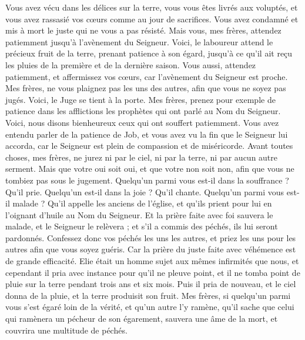 \begin{multicols}{2}
Vous avez vécu dans les délices sur la terre, vous vous êtes livrés aux voluptés, et vous avez rassasié vos cœurs comme au jour de sacrifices.
Vous avez condamné et mis à mort le juste qui ne vous a pas résisté.
Mais vous, mes frères, attendez patiemment jusqu'à l’avènement du Seigneur. Voici, le laboureur attend le précieux fruit de la terre, prenant patience à son égard, jusqu'à ce qu'il ait reçu les pluies de la première et de la dernière saison.
Vous aussi, attendez patiemment, et affermissez vos cœurs, car l’avènement du Seigneur est proche.
Mes frères, ne vous plaignez pas les uns des autres, afin que vous ne soyez pas jugés. Voici, le Juge se tient à la porte.
Mes frères, prenez pour exemple de patience dans les afflictions les prophètes qui ont parlé au Nom du Seigneur.
Voici, nous disons bienheureux ceux qui ont souffert patiemment. Vous avez entendu parler de la patience de Job, et vous avez vu la fin que le Seigneur lui accorda, car le Seigneur est plein de compassion et de miséricorde.
Avant toutes choses, mes frères, ne jurez ni par le ciel, ni par la terre, ni par aucun autre serment. Mais que votre oui soit oui, et que votre non soit non, afin que vous ne tombiez pas sous le jugement.
Quelqu’un parmi vous est-il dans la souffrance ? Qu’il prie. Quelqu’un est-il dans la joie ? Qu’il chante.
Quelqu’un parmi vous est-il malade ? Qu’il appelle les anciens de l'église, et qu'ils prient pour lui en l’oignant d'huile au Nom du Seigneur.
Et la prière faite avec foi sauvera le malade, et le Seigneur le relèvera ; et s'il a commis des péchés, ils lui seront pardonnés.
Confessez donc vos péchés les uns les autres, et priez les uns pour les autres afin que vous soyez guéris. Car la prière du juste faite avec véhémence est de grande efficacité.
Elie était un homme sujet aux mêmes infirmités que nous, et cependant il pria avec instance pour qu'il ne pleuve point, et il ne tomba point de pluie sur la terre pendant trois ans et six mois.
Puis il pria de nouveau, et le ciel donna de la pluie, et la terre produisit son fruit.
Mes frères, si quelqu'un parmi vous s’est égaré loin de la vérité, et qu’un autre l'y ramène,
qu'il sache que celui qui ramènera un pécheur de son égarement, sauvera une âme de la mort, et couvrira une multitude de péchés.
\PPE{}
\end{multicols}
